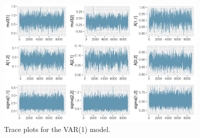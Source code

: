 \begin{figure}[H]
    \centering
    \includegraphics[width=0.9\textwidth]{images/6-VAR/traceplots.png}
    \caption{Trace plots for the VAR(1) model.}
\end{figure}